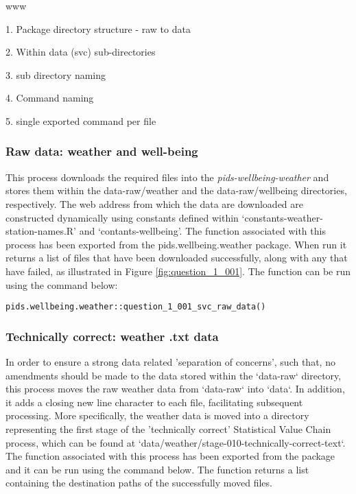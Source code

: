 www\documentclass[12pt, oneside, openany]{book}
\begin{document}
1. Package directory structure - raw to data

2. Within data (svc) sub-directories

3. sub directory naming

4. Command naming

5. single exported command per file

\subsubsection*{Raw data: weather and well-being}

This process downloads the required files into the \emph{pids-wellbeing-weather} and stores them within the data-raw/weather and the data-raw/wellbeing directories, respectively. The web address from which the data are downloaded are constructed dynamically using constants defined within `constants-weather-station-names.R' and `contants-wellbeing'. The function associated with this process has been exported from the pids.wellbeing.weather package. When run it returns a list of files that have been downloaded successfully, along with any that have failed, as illustrated in Figure \ref{fig:question_1_001}. The function can be run using the command below:

\begin{verbatim}
pids.wellbeing.weather::question_1_001_svc_raw_data()
\end{verbatim}

\subsubsection*{Technically correct: weather .txt data}

In order to ensure a strong data related 'separation of concerns', such that, no amendments should be made to the data stored within the `data-raw` directory, this process moves the raw weather data from `data-raw` into `data`. In addition, it adds a closing new line character to each file, facilitating subsequent processing. More specifically, the weather data is moved into a directory representing the first stage of the 'technically correct' Statistical Value Chain process, which can be found at `data/weather/stage-010-technically-correct-text`. The function associated with this process has been exported from the package and it can be run using the command below. The function returns a list containing the destination paths of the successfully moved files.
\end{document}
